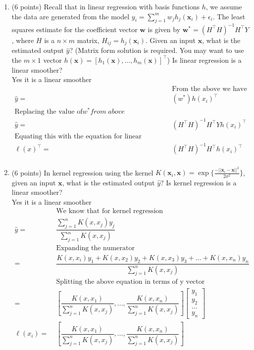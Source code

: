 \documentclass[english]{article}
\newcommand{\bx}{\mathbf{x}}
\newcommand{\bw}{\mathbf{w}}
\begin{document}
\begin{enumerate}
\item (6 points) Recall that in linear regression with basis functions
  $h$, we assume the data are generated from the model
  $y_i=\sum_{j=1}^m w_j h_j(\bx_i)+\epsilon_i$. The least squares
  estimate for the coefficient vector $\bw$ is given by $\bw^*=(H^\top
  H)^{-1}H^\top Y$, where $H$ is a $n\times m$ matrix,
  $H_{ij}=h_j(\bx_i)$. Given an input $\bx$, what is the estimated
  output $\hat{y}$? (Matrix form solution is required. You may want to
  use the $m\times 1$ vector $h(\bx)=[h_1(\bx),\ldots,h_m(\bx)]^\top$)
  Is linear regression is a linear smoother? \\

Yes it is a linear smoother \\
\begin{align*}
	&\;\text{From the above we have}\\
	\hat{y} =&\; (w^{*}) h(x_i)^{\top} \\
	\text{Replacing the value of} w^{*} from \;above \\
	\hat{y} =&\; (H^\top  H)^{-1}H^\top Y h(x_i)^{\top}\\
	\text{Equating this with the equation for linear smoother we can say}\\
	\ell(x)^\top=&\;  (H^\top  H)^{-1}H^\top h(x_i)^{\top} \\
\end{align*}


\item (6 points) In kernel regression using the kernel $K(\bx_i,\bx)=
  \exp\{\frac{-||\bx_i-\bx||^2}{2\sigma^2}\}$, given an input $\bx$,
  what is the estimated output $\hat{y}$?  Is kernel regression is a
  linear smoother? \\
Yes it is a linear smoother \\
\begin{align*}
	&\;\text{We know that for kernel regression} \\
	\hat{y} =&\; \dfrac{ \sum\limits_{j=1}^n {K(x , x_j) y_j}}
			     {\sum\limits_{j=1}^n K(x , x_j)} \\
	&\;\text{Expanding the numerator} \\
	=&\; \dfrac{K(x,x_i)y_1 + K(x,x_2)y_2+K(x,x_3)y_3+ \ldots + K(x,x_n)y_n}
		        {\sum\limits_{j=1}^n K(x , x_j)} \\
	&\;\text{Splitting the above equation in terms of y vector} \\
	=&\; \left[    \dfrac{K(x,x_1)}{\sum\limits_{j=1}^n K(x , x_j)} , \ldots ,   \dfrac{K(x,x_n)}{\sum\limits_{j=1}^n K(x , x_j)}   \right ]
		\left[   \begin{array}{c}
				y_1\\
				y_2\\
				\ldots\\
				y_n
\end{array}	               \right] \\
	\ell(x_i) =&\; \left[    \dfrac{K(x,x_1)}{\sum\limits_{j=1}^n K(x , x_j)} , \ldots ,   \dfrac{K(x,x_n)}{\sum\limits_{j=1}^n K(x , x_j)}   \right ] \\
\end{align*}


\end{enumerate}
\end{document}
